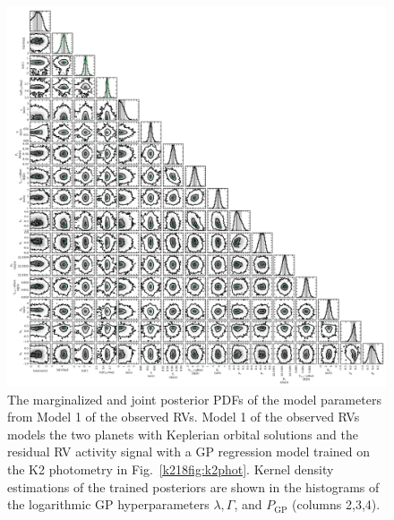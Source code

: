 \begin{figure}
\centering
\includegraphics[width=\hsize]{figures/cornerRC_K218.png}
\caption[Posterior PDF of the model parameters of the HARPS RVs.]
  {\small The marginalized and joint posterior PDFs of the model parameters from Model 1 of
  the observed RVs. Model 1 of the observed RVs models the two planets with Keplerian orbital
  solutions and the residual RV activity signal with a GP regression model trained on the K2 photometry in
  Fig.~\ref{k218fig:k2phot}. Kernel density estimations of the trained posteriors are shown in the
  histograms of the logarithmic GP hyperparameters $\lambda, \Gamma$, and $P_{\text{GP}}$
  (columns 2,3,4). \label{k218fig:cornerRV}}
\end{figure}

